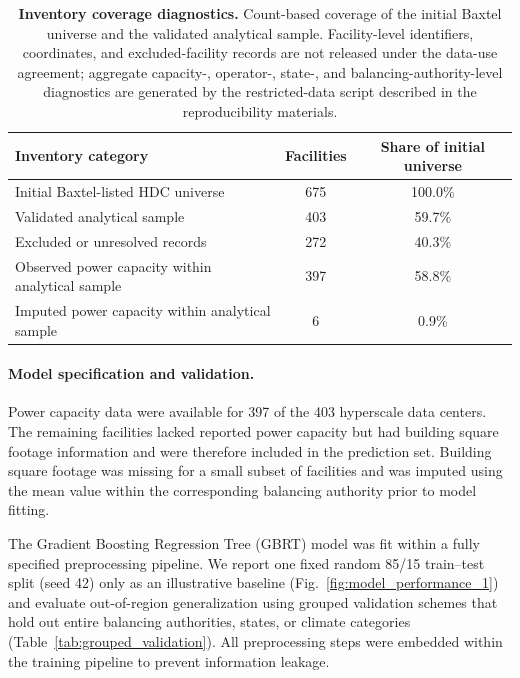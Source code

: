 \documentclass[12pt]{article}
\begin{document}
\begin{table}[H]
\centering
\caption{\textbf{Inventory coverage diagnostics.} Count-based coverage of the initial Baxtel universe and the validated analytical sample. Facility-level identifiers, coordinates, and excluded-facility records are not released under the data-use agreement; aggregate capacity-, operator-, state-, and balancing-authority-level diagnostics are generated by the restricted-data script described in the reproducibility materials.}
\label{tab:coverage_diagnostics}
\begin{tabular}{lcc}
\toprule
\textbf{Inventory category} & \textbf{Facilities} & \textbf{Share of initial universe} \\
\midrule
Initial Baxtel-listed HDC universe & 675 & 100.0\% \\
Validated analytical sample & 403 & 59.7\% \\
Excluded or unresolved records & 272 & 40.3\% \\
Observed power capacity within analytical sample & 397 & 58.8\% \\
Imputed power capacity within analytical sample & 6 & 0.9\% \\
\bottomrule
\end{tabular}
\end{table}
    


\paragraph{Model specification and validation.}

Power capacity data were available for 397 of the 403 hyperscale data centers. The remaining facilities lacked reported power capacity but had building square footage information and were therefore included in the prediction set. Building square footage was missing for a small subset of facilities and was imputed using the mean value within the corresponding balancing authority prior to model fitting.

The Gradient Boosting Regression Tree (GBRT) model was fit within a fully specified preprocessing pipeline. We report one fixed random 85/15 train--test split (seed 42) only as an illustrative baseline (Fig.~\ref{fig:model_performance_1}) and evaluate out-of-region generalization using grouped validation schemes that hold out entire balancing authorities, states, or climate categories (Table~\ref{tab:grouped_validation}). All preprocessing steps were embedded within the training pipeline to prevent information leakage.
\end{document}
